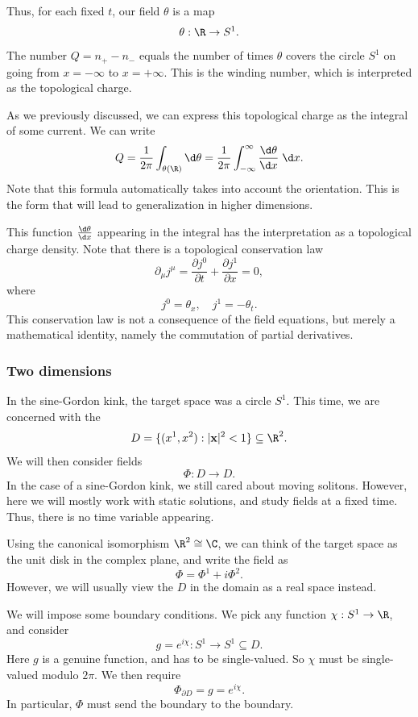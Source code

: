 \documentclass[a4paper]{article}
\begin{document}
Thus, for each fixed $t$, our field $\theta$ is a map
\[
  \theta: \R \to S^1.
\]
The number $Q = n_+ - n_-$ equals the number of times $\theta$ covers the circle $S^1$ on going from $x = -\infty$ to $x = +\infty$. This is the winding number, which is interpreted as the topological charge.

As we previously discussed, we can express this topological charge as the integral of some current. We can write
\[
  Q = \frac{1}{2\pi} \int_{\theta(\R)} \d \theta = \frac{1}{2\pi} \int_{-\infty}^\infty \frac{\d \theta}{\d x}\;\d x.
\]
Note that this formula automatically takes into account the orientation. This is the form that will lead to generalization in higher dimensions.

This function $\frac{\d \theta}{\d x}$ appearing in the integral has the interpretation as a topological charge density. Note that there is a topological conservation law
\[
  \partial_\mu j^\mu = \frac{\partial j^0}{\partial t} + \frac{\partial j^1}{\partial x} = 0,
\]
where
\[
  j^0 = \theta_x,\quad j^1 = -\theta_t.
\]
This conservation law is not a consequence of the field equations, but merely a mathematical identity, namely the commutation of partial derivatives.

\subsubsection*{Two dimensions}
In the sine-Gordon kink, the target space was a circle $S^1$. This time, we are concerned with the 
\[
  D = \{(x^1, x^2): |\mathbf{x}|^2 < 1\} \subseteq \R^2.
\]
We will then consider fields
\[
  \Phi: D \to D.
\]
In the case of a sine-Gordon kink, we still cared about moving solitons. However, here we will mostly work with static solutions, and study fields at a fixed time. Thus, there is no time variable appearing.

Using the canonical isomorphism $\R^2 \cong \C$, we can think of the target space as the unit disk in the complex plane, and write the field as
\[
  \Phi = \Phi^1 + i \Phi^2.
\]
However, we will usually view the $D$ in the domain as a real space instead.

We will impose some boundary conditions. We pick any function $\chi: S^1 \to \R$, and consider
\[
  g = e^{i\chi}: S^1 \to S^1 \subseteq D.
\]
Here $g$ is a genuine function, and has to be single-valued. So $\chi$ must be single-valued modulo $2\pi$. We then require
\[
  \Phi_{\partial D} = g = e^{i \chi}.
\]
In particular, $\Phi$ must send the boundary to the boundary.
\end{document}
